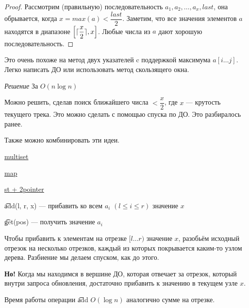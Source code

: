\begin{proof}
	Рассмотрим (правильную) последовательность $a_1, a_2, \ldots, a_x, last$, она обрывается, когда $x=max(a) < \dfrac{last}{2}$. Заметим, что все значения элементов $a$ находятся в диапазоне $\left[\ceil{\dfrac{x}{2}}, x\right]$. Любые числа из $a$ дают хорошую последовательность.
\end{proof}

Это очень похоже на метод двух указателей c поддержкой максимума $a[i \ldots j]$. Легко написать ДО или использовать метод скользящего окна.

\down

{\it Решение } За $O(n \log n)$
\href{https://codeforces.com/contest/1237/submission/62700019}{}

Можно решить, сделав поиск ближайшего числа $< \dfrac{x}{2}$, где $x$ --- крутость текущего трека. Это можно сделать с помощью спуска по ДО. Это разбиралось ранее. 

Также можно комбинировать эти идеи.

\href{https://codeforces.com/contest/1237/submission/62700598}{multiset }

\href{https://codeforces.com/contest/1237/submission/62695687}{map }

\href{https://codeforces.com/contest/1237/submission/62712896}{st + 2pointer }

\pagebreak


\begin{MyList}[0pt]
	\item \t{add(l, r, x)} --- прибавить ко всем $a_i$ $(l \le i \le r)$ значение $x$
	\item \t{get(pos)} --- получить значение $a_i$
\end{MyList}
\up \up


Чтобы прибавить к элементам на отрезке $[l \ldots r)$ значение $x$, разобьём исходный отрезок на несколько отрезков, каждый из которых покрывается каким-то узлом дерева. Разбиение мы делаем спуском, как до этого.

{\bf Но!} Когда мы находимся в вершине ДО, которая отвечает за отрезок, который внутри запроса обновления, достаточно прибавить к значению в текущем узле $x$.

Время работы операции \t{add} $O(\log n)$ аналогично сумме на отрезке.
\down

